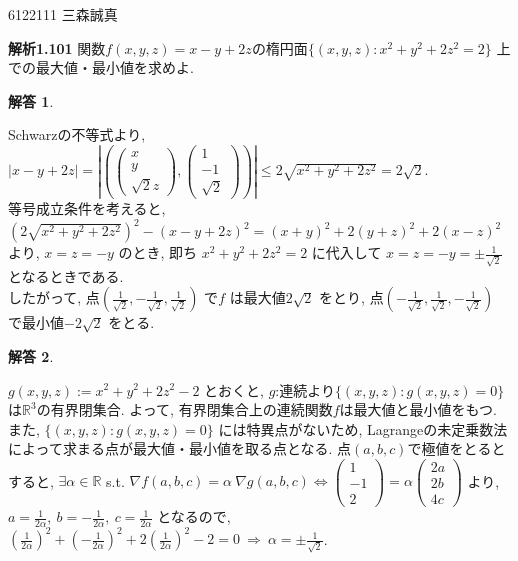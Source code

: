 \documentclass{jsarticle}
\newtheorem{answer}{解答}
\begin{document}
\begin{flushright}
6122111 三森誠真
\end{flushright}

\begin{itembox}[l]{\textbf{解析1.101}}
関数$f(x,y,z) = x-y+2z $の楕円面$\{(x,y,z) : x^2+y^2+2z^2=2\}$ 上での最大値・最小値を求めよ.
\end{itembox}

\begin{answer}
\end{answer}
Schwarzの不等式より, 
$|x-y+2z| = \left|\left( \begin{pmatrix} x \\ y \\ \sqrt{2}z \end{pmatrix} , \begin{pmatrix} 1 \\ -1 \\ \sqrt{2} \end{pmatrix} \right)\right| \le 2\sqrt{x^2+y^2+2z^2} = 2\sqrt{2}$. \\
等号成立条件を考えると, $(2\sqrt{x^2+y^2+2z^2})^2 - (x-y+2z)^2 = (x+y)^2 +2(y+z)^2 + 2(x-z)^2$ より, $x = z = -y$ のとき, 即ち $x^2+y^2+2z^2 = 2$ に代入して $x = z = -y = \pm \displaystyle \frac{1}{\sqrt{2}}$ となるときである. \\
したがって, 点$\left(\displaystyle \frac{1}{\sqrt{2}}, -\displaystyle \frac{1}{\sqrt{2}}, \displaystyle \frac{1}{\sqrt{2}} \right)$ で$f$ は最大値$2\sqrt{2}$ をとり, 点$\left(-\displaystyle \frac{1}{\sqrt{2}}, \displaystyle \frac{1}{\sqrt{2}}, -\displaystyle \frac{1}{\sqrt{2}} \right)$ で最小値$-2\sqrt{2}$ をとる.

\bigskip
\bigskip
\bigskip

\begin{answer}
\end{answer}

$g(x,y,z) := x^2+y^2+2z^2-2$ とおくと, $g$:連続より$\{ (x,y,z) : g(x,y,z) = 0 \}$ は$\mathbb{R}^3$の有界閉集合. よって, 有界閉集合上の連続関数$f$は最大値と最小値をもつ. また, $\{ (x,y,z) : g(x,y,z) = 0 \}$ には特異点がないため, Lagrangeの未定乗数法によって求まる点が最大値・最小値を取る点となる. 点$(a,b,c)$で極値をとるとすると, $\exists \alpha \in \mathbb{R}$ s.t. $\nabla f (a,b,c) = \alpha \ \nabla g (a,b,c) \Longleftrightarrow 
\begin{pmatrix} 1 \\ -1 \\ 2 \end{pmatrix} = \alpha \begin{pmatrix} 2a \\ 2b \\ 4c \end{pmatrix}$ より, $a = \displaystyle \frac{1}{2\alpha}, \ b = -\displaystyle \frac{1}{2\alpha}, \ c = \displaystyle \frac{1}{2\alpha}$ となるので,
$ \left( \displaystyle \frac{1}{2\alpha} \right)^2 + \left( -\displaystyle \frac{1}{2\alpha} \right)^2 + 2\left( \displaystyle \frac{1}{2\alpha} \right)^2 -2 = 0 \ \Longrightarrow \ \alpha = \pm \displaystyle \frac{1}{\sqrt{2}}$.
\end{document}
